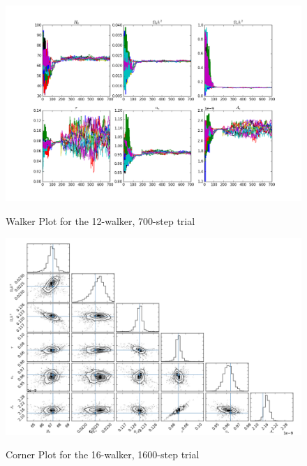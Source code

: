 \documentclass[aps,prd,final,twocolumn]{revtex4}
\begin{document}
\begin{figure}
\begin{center}
\includegraphics[scale=.4]{runs_12_700.png}
\label{fig:f2}
\caption{Walker Plot for the 12-walker, 700-step trial}
\end{center}
\end{figure}

\begin{figure}
\begin{center}
\includegraphics[scale=.4]{data_16_800.png}
\label{fig:f3}
\caption{Corner Plot for the 16-walker, 1600-step trial}
\end{center}
\end{figure}
\end{document}
